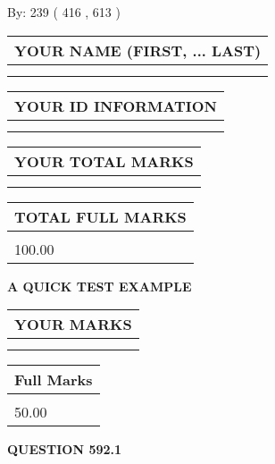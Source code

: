 \documentclass[12pt]{article}
\begin{document}
   
\hspace{1.0in} By: 
 239 ( 416 ,  613 )
   
   
   
   
\newpage 
\setcounter{page}{ 
   592001 } 
   
   
   
   
\noindent\begin{tabular}{|l|}
\hline
YOUR NAME (FIRST, ... LAST)  \\
\hline
 \\ 
 \\ 
\hline
\end{tabular}
\hspace{0.05in} \begin{tabular}{|l|}
\hline
 YOUR   ID   INFORMATION  \\
\hline
 \\ 
 \\ 
\hline
\end{tabular}
   
   
\vspace{0.2in}\noindent\begin{tabular}{|l|}
\hline
YOUR TOTAL MARKS  \\
\hline
 \\ 
 \\ 
\hline
\end{tabular}
\hspace{0.05in} \begin{tabular}{|l|}
\hline
TOTAL FULL MARKS  \\
\hline
 \\ 
100.00 \\
\hline
\end{tabular}
   
   
 \vspace{0.2in}
{\LARGE {\textbf{ A QUICK TEST EXAMPLE}}}
   
   
  
\vspace{0.2in}
  
\noindent\begin{tabular}{|l|}
\hline
 YOUR MARKS  \\
\hline
 \\ 
 \\ 
\hline
\end{tabular}
\hspace{0.05in} \begin{tabular}{|l|}
\hline
 Full Marks  \\
\hline
 \\ 
50.00 \\
\hline
\end{tabular}
{\textbf{\Large{QUESTION
592.1 
}}}
  
\end{document}

